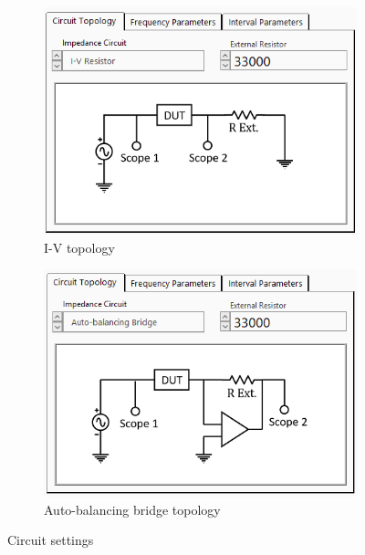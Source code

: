 \begin{figure}[h]
    \centering
    \begin{subfigure}[b]{0.48\textwidth}
        \centering
        \includegraphics[width=\textwidth]{images/labview_circuit_IV.png}
        \caption{I-V topology}
        \label{fig:labview_I-V_circ}
    \end{subfigure}
    \hfill
    \begin{subfigure}[b]{0.48\textwidth}
        \centering
        \includegraphics[width=\textwidth]{images/labview_circuit_auto.png}
        \caption{Auto-balancing bridge topology}
        \label{fig:labview_auto_circ}
    \end{subfigure}
    \caption{Circuit settings}
    \label{fig:labview_circuit_settings}
\end{figure}

